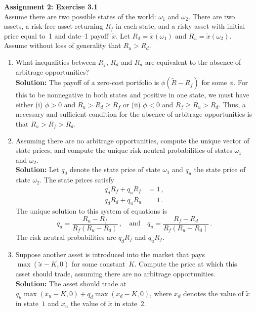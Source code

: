 \documentclass[11pt]{article}
\newcommand{\sol}{\textbf{Solution:} \hspace{2ex}}
\theoremstyle{definition}
\begin{document}
\begin{enumerate}
%
%
\noindent \textbf{Assignment 2: Exercise 3.1}\\
\noindent 
Assume there are two possible states of the world: $\omega_1$ and $\omega_2$.  There are two assets, a risk-free asset returning $R_f$ in each state, and a risky asset with initial price equal to~1 and date--1 payoff~$\tilde{x}$.  Let $R_d=\tilde{x}(\omega_1)$ and $R_u=\tilde{x}(\omega_2)$.  Assume without loss of generality that $R_u > R_d$.
\begin{enumerate}\renewcommand{\labelenumi}{(\alph{enumi})}
\item What inequalities between $R_f$, $R_d$ and $R_u$ are equivalent to the absence of arbitrage opportunities?\\
\noindent\sol The payoff of a zero-cost portfolio is $\phi(\tilde{R}-R_f)$ for some $\phi$.  For this to be nonnegative in both states and positive in one state, we must have either (i) $\phi>0$ and $R_u>R_d \geq R_f$ or (ii) $\phi<0$ and $R_f \geq R_u > R_d$.  Thus, a necessary and sufficient condition for the absence of arbitrage opportunities is that $R_u>R_f>R_d$.
\item Assuming there are no arbitrage opportunities, compute the unique vector of state prices,
and compute the unique risk-neutral probabilities of states $\omega_1$ and $\omega_2$.\\
\noindent\sol Let $q_d$ denote the state price of state $\omega_1$ and $q_u$ the state price of state $\omega_2$.  The state prices satisfy
\begin{align*}
q_dR_f + q_u R_f &=1\,,\\
q_d R_d + q_uR_u &=1\,.
\end{align*}
The unique solution to this system of equations is
$$q_d = \frac{R_u-R_f}{R_f(R_u-R_d)}\,,\quad \text{and}\quad q_u = \frac{R_f-R_d}{R_f(R_u-R_d)}\,.$$
The risk neutral probabilities are  $q_dR_f$ and $q_uR_f$.
\item Suppose another asset is introduced into the market that pays $\max(\tilde{x}-K,0)$ for some constant~$K$.  Compute the price at which this asset should trade, assuming there are no arbitrage opportunities.\\
\noindent\sol The asset should trade at
$q_u \max(x_u-K,0) + q_d\max(x_d-K,0)$, where $x_d$ denotes the value of $\tilde{x}$ in state~$1$ and $x_u$ the value of $\tilde{x}$ in state~$2$.
\end{enumerate}



\end{enumerate}
\end{document}
